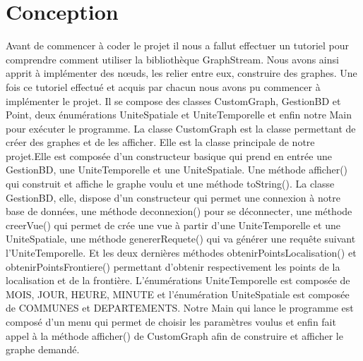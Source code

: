 \chapter{Conception}
Avant de commencer à coder le projet il nous a fallut effectuer un tutoriel pour comprendre comment utiliser la bibliothèque GraphStream. Nous avons ainsi apprit à implémenter des nœuds, les relier entre eux, construire des graphes.
Une fois ce tutoriel effectué et acquis par chacun nous avons pu commencer à implémenter le projet. \newline
Il se compose des classes CustomGraph, GestionBD et Point, deux énumérations UniteSpatiale et UniteTemporelle et enfin notre Main pour exécuter le programme.
\newline  La classe CustomGraph est la classe permettant de créer des graphes et de les afficher. Elle est la classe principale de notre projet.Elle est composée d'un constructeur basique qui prend en entrée une GestionBD, une UniteTemporelle et une UniteSpatiale. Une méthode afficher() qui construit et affiche le graphe voulu et une méthode toString().
\newline La classe GestionBD, elle, dispose d'un constructeur qui permet une connexion à notre base de données, une méthode deconnexion() pour se déconnecter, une méthode creerVue() qui permet de crée une vue à partir d'une UniteTemporelle et une UniteSpatiale, une méthode genererRequete() qui va générer une requête suivant l'UniteTemporelle. Et les deux dernières méthodes obtenirPointsLocalisation() et obtenirPointsFrontiere() permettant d'obtenir respectivement les points de la localisation et de la frontière.
\newline  L'énumérations UniteTemporelle est composée de MOIS, JOUR, HEURE, MINUTE et l'énumération UniteSpatiale est composée de COMMUNES et DEPARTEMENTS.
\newline  Notre Main qui lance le programme est composé d'un menu qui permet de choisir les paramètres voulus et enfin fait appel à la méthode afficher() de CustomGraph afin de construire et afficher le graphe demandé.
